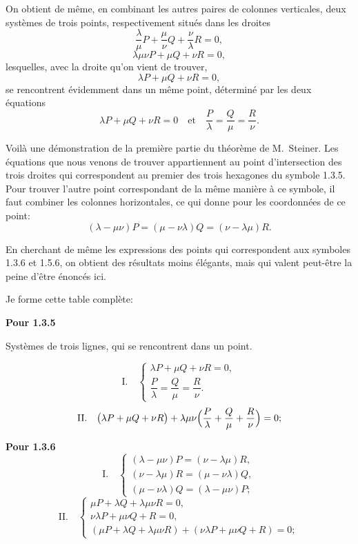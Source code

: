 \documentclass[12pt,a4paper]{article}
\begin{document}
On obtient de m\^eme, en combinant les autres paires de colonnes verticales, deux syst\`emes de trois points, respectivement situ\'es dans les droites
\[
\frac{\lambda}{\mu} P + \frac{\mu}{\nu} Q + \frac{\nu}{\lambda} R = 0,
\]
\[
\lambda\mu\nu P + \mu Q + \nu R = 0,
\]
lesquelles, avec la droite qu'on vient de trouver,
\[
\lambda P + \mu Q + \nu R = 0,
\]
se rencontrent \'evidemment dans un m\^eme point, d\'etermin\'e par les deux \'equations
\[
\lambda P + \mu Q + \nu R = 0\quad\text{et}\quad \frac{P}{\lambda} = \frac{Q}{\mu} = \frac{R}{\nu}.
\]

Voil\`a une d\'emonstration de la premi\`ere partie du th\'eor\`eme de M.~Steiner. Les \'equations que nous venons de trouver appartiennent au point d'intersection des trois droites qui correspondent au premier des trois hexagones du symbole 1.3.5. Pour trouver l'autre point correspondant de la m\^eme mani\`ere \`a ce symbole, il faut combiner les colonnes horizontales, ce qui donne pour les coordonn\'ees de ce point:
\[
(\lambda - \mu\nu) P = (\mu - \nu\lambda) Q = (\nu - \lambda\mu) R.
\]

En cherchant de m\^eme les expressions des points qui correspondent aux symboles 1.3.6 et 1.5.6, on obtient des r\'esultats moins \'el\'egants, mais qui valent peut-\^etre la peine d'\^etre \'enonc\'es ici.

Je forme cette table compl\`ete:

\bigskip
\noindent\textbf{Pour 1.3.5}
\begin{center}
Syst\`emes de trois lignes, qui se rencontrent dans un point.
\end{center}
\[
\text{I.}\quad\begin{cases} \lambda P + \mu Q + \nu R = 0,\\ \dfrac{P}{\lambda} = \dfrac{Q}{\mu} = \dfrac{R}{\nu}.\end{cases}
\]
\[
\text{II.}\quad \bigl(\lambda P + \mu Q + \nu R\bigr) + \lambda\mu\nu\Bigl(\frac{P}{\lambda} + \frac{Q}{\mu} + \frac{R}{\nu}\Bigr) = 0;
\]

\bigskip
\noindent\textbf{Pour 1.3.6}
\[
\text{I.}\quad\begin{cases} (\lambda - \mu\nu) P = (\nu - \lambda\mu) R,\\ (\nu - \lambda\mu) R = (\mu - \nu\lambda) Q,\\ (\mu - \nu\lambda) Q = (\lambda - \mu\nu) P; \end{cases}
\]
\[
\text{II.}\quad\begin{cases} \mu P + \lambda Q + \lambda\mu\nu R = 0,\\ \nu\lambda P + \mu\nu Q + R = 0,\\ (\mu P + \lambda Q + \lambda\mu\nu R) + (\nu\lambda P + \mu\nu Q + R) = 0; \end{cases}
\]
\end{document}
